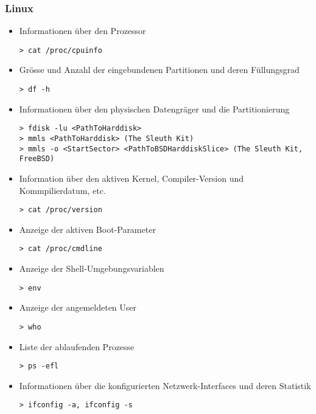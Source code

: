 \subsubsection{Linux}
\begin{itemize}
\item Informationen über den Prozessor 
\begin{lstlisting}
> cat /proc/cpuinfo
\end{lstlisting}

\item Grösse und Anzahl der eingebundenen Partitionen und deren Füllungsgrad 
\begin{lstlisting}
> df -h
\end{lstlisting}

\item  Informationen über den physischen Datengräger und die Partitionierung
\begin{lstlisting}
> fdisk -lu <PathToHarddisk>
> mmls <PathToHarddisk> (The Sleuth Kit)
> mmls -o <StartSector> <PathToBSDHarddiskSlice> (The Sleuth Kit, FreeBSD)
\end{lstlisting}

\item  Information über den aktiven Kernel, Compiler-Version und Kommpilierdatum, etc.
\begin{lstlisting}
> cat /proc/version
\end{lstlisting}

\item  Anzeige der aktiven Boot-Parameter
\begin{lstlisting}
> cat /proc/cmdline
\end{lstlisting}


\item  Anzeige der Shell-Umgebungsvariablen
\begin{lstlisting}
> env
\end{lstlisting}

\item  Anzeige der angemeldeten User
\begin{lstlisting}
> who
\end{lstlisting}

\item  Liste der ablaufenden Prozesse
\begin{lstlisting}
> ps -efl
\end{lstlisting}

\item  Informationen über die konfigurierten Netzwerk-Interfaces und deren Statistik 
\begin{lstlisting}
> ifconfig -a, ifconfig -s
\end{lstlisting}


\end{itemize}
